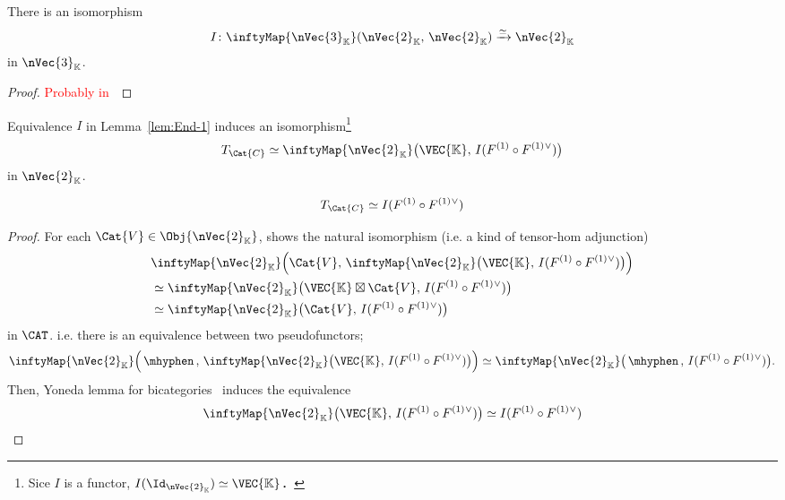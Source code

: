 \documentclass[TQFT_main]{subfiles}
\begin{document}
\begin{mylem}[label=lem:End-1]{}
    There is an isomorphism
    \begin{align}
        I \colon \inftyMap{\nVec{3}_{\mathbb{K}}} (\nVec{2}_{\mathbb{K}},\, \nVec{2}_{\mathbb{K}}) \xrightarrow{\simeq} \nVec{2}_{\mathbb{K}}
    \end{align}
    in $\nVec{3}_{\mathbb{K}}$.
\end{mylem}

\begin{proof}
    \textcolor{red}{Probably in~\cite{Scholze2026Gestalten}}
\end{proof}

Equivalence $I$ in Lemma~\ref{lem:End-1} induces an isomorphism\footnote{Sice $I$ is a functor, $I(\Id_{\nVec{2}_{\mathbb{K}}}) \simeq \VEC{\mathbb{K}}$．}
\begin{align}
    T_{\Cat{C}} 
    \simeq \inftyMap{\nVec{2}_{\mathbb{K}}} \bigl(\VEC{\mathbb{K}},\, I(F^{(1)} \circ F^{(1)}{}^{\vee}) \bigr)
\end{align}
in $\nVec{2}_{\mathbb{K}}$.

\begin{myprop}[label=prop:closed-monoidal]{}
    \begin{align}
        T_{\Cat{C}} \simeq I(F^{(1)} \circ F^{(1)}{}^{\vee})
    \end{align}
\end{myprop}

\begin{proof}
    For each $\Cat{V} \in \Obj{\nVec{2}_{\mathbb{K}}}$,  shows the natural isomorphism (i.e. a kind of tensor-hom adjunction)
    \begin{align}
        &\inftyMap{\nVec{2}_{\mathbb{K}}} \Bigl(\Cat{V},\, \inftyMap{\nVec{2}_{\mathbb{K}}} \bigl(\VEC{\mathbb{K}},\, I(F^{(1)} \circ F^{(1)}{}^\vee)\bigr)\Bigr) \\
        &\simeq \inftyMap{\nVec{2}_{\mathbb{K}}} \bigl(\VEC{\mathbb{K}} \boxtimes \Cat{V},\, I(F^{(1)} \circ F^{(1)}{}^\vee)\bigr) \\
        &\simeq \inftyMap{\nVec{2}_{\mathbb{K}}} \bigl(\Cat{V},\, I(F^{(1)} \circ F^{(1)}{}^\vee)\bigr)
    \end{align}
    in $\CAT$. i.e. there is an equivalence between two pseudofunctors;
    \begin{align}
        \inftyMap{\nVec{2}_{\mathbb{K}}} \Bigl(\,\mhyphen \,,\, \inftyMap{\nVec{2}_{\mathbb{K}}} \bigl(\VEC{\mathbb{K}},\, I(F^{(1)} \circ F^{(1)}{}^\vee)\bigr)\Bigr)
        \simeq \inftyMap{\nVec{2}_{\mathbb{K}}} \bigl(\, \mhyphen \,,\, I(F^{(1)} \circ F^{(1)}{}^\vee)\bigr).
    \end{align}
    Then, Yoneda lemma for bicategories~\cite[Lemma 8.3.11.]{Yau2020bicategory} induces the equivalence
    \begin{align}
        \inftyMap{\nVec{2}_{\mathbb{K}}} \bigl(\VEC{\mathbb{K}},\, I(F^{(1)} \circ F^{(1)}{}^\vee)\bigr) \simeq I(F^{(1)} \circ F^{(1)}{}^\vee)
    \end{align}
\end{proof}
\end{document}
